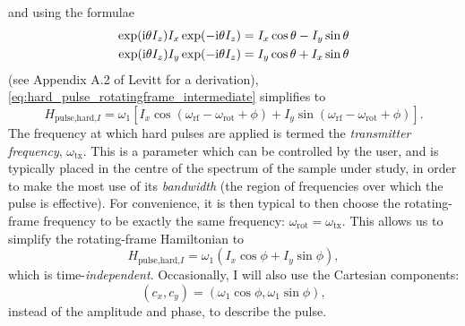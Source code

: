 and using the formulae
\begin{align}
    \exp(\mathrm{i}\theta I_z)I_x\exp(-\mathrm{i}\theta I_z) = I_x\cos\theta - I_y\sin\theta \label{eq:sandwich_formula_1} \\
    \exp(\mathrm{i}\theta I_z)I_y\exp(-\mathrm{i}\theta I_z) = I_y\cos\theta + I_x\sin\theta \label{eq:sandwich_formula_2}
\end{align}
(see Appendix A.2 of Levitt\autocite{Levitt2008} for a derivation), \cref{eq:hard_pulse_rotatingframe_intermediate} simplifies to
\begin{equation}
    \label{eq:hard_pulse_rotatingframe}
    H_{\text{pulse,hard,}I} = \omega_1 \left[I_x \cos(\omega_\text{rf} - \omega_\text{rot} + \phi) + I_y \sin(\omega_\text{rf} - \omega_\text{rot} + \phi) \right].
\end{equation}
The frequency at which hard pulses are applied is termed the \textit{transmitter frequency}, $\omega_\text{tx}$.
This is a parameter which can be controlled by the user, and is typically placed in the centre of the spectrum of the sample under study, in order to make the most use of its \textit{bandwidth} (the region of frequencies over which the pulse is effective).
For convenience, it is then typical to then choose the rotating-frame frequency to be exactly the same frequency: $\omega_\text{rot} = \omega_\text{tx}$.
This allows us to simplify the rotating-frame Hamiltonian to
\begin{equation}
    \label{eq:hard_pulse_onresonance}
    H_{\text{pulse,hard,}I} = \omega_1 (I_x\cos\phi + I_y\sin\phi),
\end{equation}
which is time-\textit{independent}.
Occasionally, I will also use the Cartesian components:
\begin{equation}
    \label{eq:pulse_cartesian}
    (c_x, c_y) = (\omega_1 \cos\phi, \omega_1 \sin\phi),
\end{equation}
instead of the amplitude and phase, to describe the pulse.

